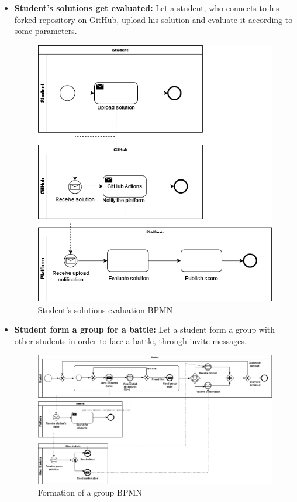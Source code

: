 \documentclass{article}
\begin{document}
{\begin{itemize}
    \item \textbf{Student's solutions get evaluated:} Let a student, who connects to his forked repository on GitHub, upload his solution and evaluate it according to some parameters.
          \begin{figure}[H]
              \centering
              \includegraphics[scale=0.35]{images/BPMN/BPMN6.png}
              \caption{Student's solutions evaluation BPMN}
              \label{fig:studSolEvalBPMN}
          \end{figure}

    \item \textbf{Student form a group for a battle:} Let a student form a group with other students in order to face a battle, through invite messages.
          \begin{figure}[H]
              \centering
              \hspace*{-0.9cm}\includegraphics[scale=0.35]{images/BPMN/BPMN7.png}
              \caption{Formation of a group BPMN}
              \label{fig:groupFormationBPMN}
          \end{figure}
\end{itemize}



}
\end{document}
